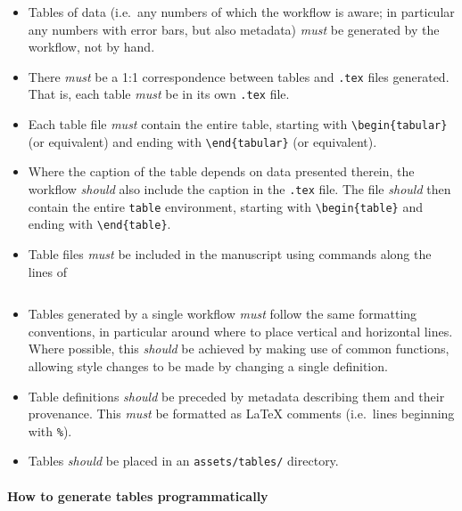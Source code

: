 \documentclass{article}
\newcommand\rfcword[1]{\emph{#1}\xspace}
\newcommand\must{\rfcword{must}}
\newcommand\should{\rfcword{should}}
\newcommand\filename[1]{\texttt{#1}\xspace}
\begin{document}
\begin{itemize}
  \item
        Tables of data
        (i.e.~any numbers of which the workflow is aware;
        in particular any numbers with error bars,
        but also metadata)
        \must be generated by the workflow,
        not by hand.
  \item
        There \must be a 1:1 correspondence between tables and \filename{.tex} files generated.
        That is,
        each table \must be in its own \filename{.tex} file.
  \item
        Each table file \must contain the entire table,
        starting with \verb|\begin{tabular}|
        (or equivalent)
        and ending with \verb|\end{tabular}|
        (or equivalent).
  \item
        Where the caption of the table depends on data presented therein,
        the workflow \should also include the caption in the \filename{.tex} file.
        The file \should then contain the entire \verb|table| environment,
        starting with \verb|\begin{table}|
        and ending with \verb|\end{table}|.
  \item
        Table files \must be included in the manuscript using commands along the lines of
\begin{verbatim}

\end{verbatim}
  \item
        Tables generated by a single workflow
        \must follow the same formatting conventions,
        in particular around where to place vertical and horizontal lines.
        Where possible,
        this \should be achieved by making use of common functions,
        allowing style changes to be made by changing a single definition.
  \item
        Table definitions \should be preceded by metadata describing them and their provenance.
        This \must be formatted as LaTeX comments
        (i.e.\ lines beginning with \verb|%|).
  \item
        Tables \should be placed in an \filename{assets/tables/} directory.
\end{itemize}

\paragraph{How to generate tables programmatically}
\end{document}
